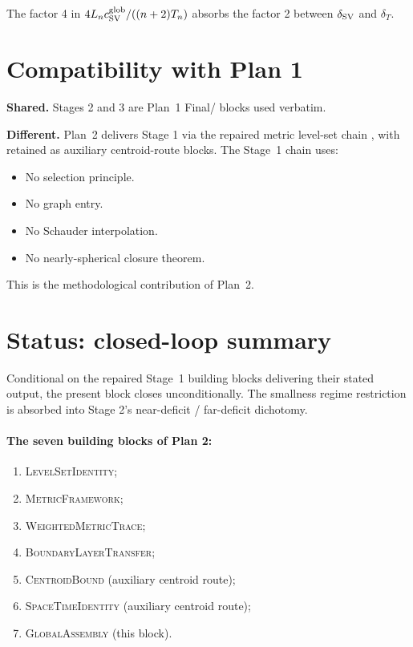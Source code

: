 \documentclass[11pt]{article}
\theoremstyle{definition}
\begin{document}
The factor 4 in $4L_n c_{\rm SV}^{\rm glob}/((n+2)T_n)$ absorbs the
factor 2 between $\delta_{\rm SV}$ and $\delta_T$.

\section{Compatibility with Plan 1}\label{sec:compat}

\textbf{Shared.} Stages 2 and 3 are Plan~1 Final/ blocks
\cite{BDV-BoundedReduction-Plan1,KohlerJobinTransfer-Plan1} used verbatim.

\textbf{Different.} Plan~2 delivers Stage 1 via the repaired metric
level-set chain
\cite{LevelSetIdentity,MetricFramework,WeightedMetricTrace,BoundaryLayerTransfer},
with \cite{CentroidBound,SpaceTimeIdentity} retained as auxiliary
centroid-route blocks.  The Stage~1 chain uses:
\begin{itemize}
\item No selection principle.
\item No graph entry.
\item No Schauder interpolation.
\item No nearly-spherical closure theorem.
\end{itemize}
This is the methodological contribution of Plan~2.

\section{Status: closed-loop summary}\label{sec:open}

Conditional on the repaired Stage~1 building blocks delivering their stated
output, the present block closes unconditionally. The smallness regime
restriction is absorbed into Stage 2's near-deficit / far-deficit dichotomy.

\paragraph{The seven building blocks of Plan 2:}
\begin{enumerate}
\item \textsc{LevelSetIdentity};
\item \textsc{MetricFramework};
\item \textsc{WeightedMetricTrace};
\item \textsc{BoundaryLayerTransfer};
\item \textsc{CentroidBound} (auxiliary centroid route);
\item \textsc{SpaceTimeIdentity} (auxiliary centroid route);
\item \textsc{GlobalAssembly} (this block).
\end{enumerate}
\end{document}
